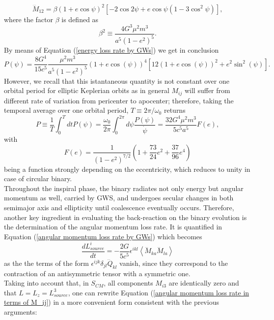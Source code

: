 \documentclass[12pt,twoside,openany]{book}
\begin{document}
\begin{equation}
    \dddot{M}_{12} = \beta (1 + e \cos \psi)^2 \left[ -2 \cos 2\psi + e \cos \psi (1 - 3 \cos^2 \psi) \right],
\end{equation}
where the factor $\beta$ is defined as
\begin{equation}
\beta^2 \equiv \frac{4 G^3 \mu^2 m^3}{a^5 (1 - e^2)^5}. 
\end{equation}
By means of Equation (\ref{energy loss rate by GWs}) we get in conclusion
\begin{equation}
    P(\psi)=\frac{8G^4}{15c^5}\frac{\mu^2m^3}{a^5(1-e^2)^5}(1+e\cos(\psi))^4[12(1+e\cos(\psi))^2+e^2\sin^2(\psi)].
\end{equation}
However, we recall that this istantaneous quantity is not constant over one orbital period for elliptic Keplerian orbits as in general $M_{ij}$ will suffer from different rate of variation from pericenter to apocenter; therefore, taking the temporal average over one orbital period, $T\equiv2\pi/\omega_0$ returns
\begin{equation}\label{P of GWs binary}
    P\equiv\frac{1}{T}\int_0^T dtP(\psi)=\frac{\omega_0}{2\pi}\int_0^{2\pi} d\psi \frac{P(\psi)}{\dot{\psi}}=\frac{32G^4\mu^2m^3}{5c^5a^5}F(e),
\end{equation}
with 
\begin{equation}\label{F(e) definition}
    F(e)=\frac{1}{(1-e^2)^{7/2}}\left(1+\frac{73}{24}e^2+\frac{37}{96}e^4\right)
\end{equation}
being a function strongly depending on the eccentricity, which reduces to unity in case of circular binary.\\Throughout the inspiral phase, the binary radiates not only energy but angular momentum as well, carried by GWS, and undergoes secular changes in both semimajor axis and ellipticity until coalescence eventually occurs. Therefore, another key ingredient in evaluating the back-reaction on the binary evolution is the determination of the angular momentum loss rate. It is quantified in Equation (\ref{angular momentum loss rate by GWs}) which becomes
\begin{equation}\label{angular momentum loss rate in terms of M_ij}
    \frac{dL^i_{source}}{dt}=-\frac{2G}{5c^5}\epsilon^{ikl}\left<\dddot{M}_{ka}\dddot{M}_{la}\right>
\end{equation}
as the the terms of the form $\epsilon^{ijk}\delta_{jl}\dddot{Q}_{kl}$ vanish, since they correspond to the contraction of an antisymmetric tensor with a symmetric one.\\Taking into account that, in $S_{CM}$, all components $M_{i3}$ are identically zero and that $L=L_z=L^3_{source}$, one can rewrite Equation (\ref{angular momentum loss rate in terms of M_ij}) in a more convenient form consistent with the previous arguments:
\end{document}
